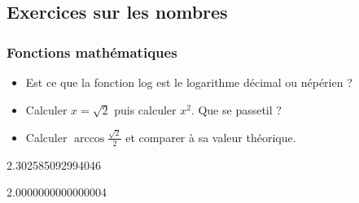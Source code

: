 \documentclass[letterpaper,10pt,english]{sphinxhowto}
\begin{document}
\subsection{Exercices sur les nombres}
\label{\detokenize{cours2_nombres_corr_exercices:exercices-sur-les-nombres}}\label{\detokenize{cours2_nombres_corr_exercices::doc}}

\subsubsection{Fonctions mathématiques}
\label{\detokenize{cours2_nombres_corr_exercices:fonctions-mathematiques}}\begin{itemize}
\item {} 
\sphinxAtStartPar
Est ce que la fonction log est le logarithme décimal ou népérien ?

\item {} 
\sphinxAtStartPar
Calculer \(x = \sqrt{2}\) puis calculer \(x^2\). Que se passe\sphinxhyphen{}t\sphinxhyphen{}il ?

\item {} 
\sphinxAtStartPar
Calculer \(\arccos{\frac{\sqrt{2}}{2}}\) et comparer à sa valeur théorique.

\end{itemize}

\begin{sphinxVerbatim}[commandchars=\\\{\}]
   

\end{sphinxVerbatim}

\begin{sphinxVerbatim}[commandchars=\\\{\}]
2.302585092994046
\end{sphinxVerbatim}

\begin{sphinxVerbatim}[commandchars=\\\{\}]
   
\end{sphinxVerbatim}

\begin{sphinxVerbatim}[commandchars=\\\{\}]
2.0000000000000004
\end{sphinxVerbatim}
\end{document}
